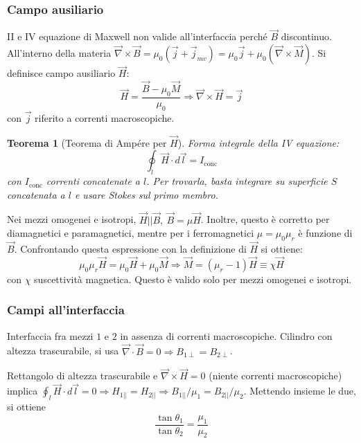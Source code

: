 \documentclass[10pt, a4paper]{scrartcl}
\numberwithin{equation}{subsection}
\theoremstyle{style1}
\newtheorem{teorema}{Teorema}[section]
\begin{document}
\subsubsection{Campo ausiliario}
II e IV equazione di Maxwell non valide all'interfaccia perch\'e $\vec{B}$ discontinuo. All'interno della materia $\vec{\nabla }\times \vec{B} = \mu_0 (\vec{j}+\vec{j}_{mv} )= \mu_0\vec{j} + \mu_0 (\vec{\nabla }\times \vec{M})$. Si definisce campo ausiliario $\vec{H}$:
\begin{equation}
		\vec{H} = \frac{\vec{B}- \mu_0\vec{M}}{\mu_0} \Rightarrow \vec{\nabla }\times \vec{H}= \vec{j}
\end{equation}
con $\vec{j}$ riferito a correnti macroscopiche.
\begin{teorema}
	[Teorema di Amp\'ere per $\vec{H}$]
	Forma integrale della IV equazione:
	\begin{equation}
		\oint_{l} \vec{H}\cdot d\vec{l}= I_\text{conc}
	\end{equation}
	con $I_\text{conc}$ correnti concatenate a $l$. Per trovarla, basta integrare su superficie $S$ concatenata a $l$ e usare Stokes sul primo membro.
\end{teorema}
Nei mezzi omogenei e isotropi, $\vec{H}| |\vec{B}, \ \vec{B} = \mu \vec{H}$. Inoltre, questo \`e corretto per diamagnetici e paramagnetici, mentre per i ferromagnetici $\mu = \mu_0 \mu _r$ \`e funzione di $\vec{B}$. Confrontando questa espressione con la definizione di $\vec{H}$ si ottiene:
\begin{equation}
	\mu_0 \mu_r \vec{H}=\mu_0 \vec{H}+ \mu_0\vec{M}\Rightarrow \vec{M}=(\mu_r -1) \vec{H}\equiv \chi \vec{H}
\end{equation}
con $\chi $ suscettivit\`a magnetica. Questo \`e valido solo per mezzi omogenei e isotropi.
\subsubsection{Campi all'interfaccia}

Interfaccia fra mezzi $1$ e $2$ in assenza di correnti macroscopiche. Cilindro con altezza trascurabile, si usa $\vec{\nabla }\cdot \vec{B} =0 \Rightarrow B_{1\perp} = B_{2\perp}  $.

Rettangolo di altezza trascurabile e $\vec{\nabla }\times \vec{H}=0$ (niente correnti macroscopiche) implica $\oint_{l} \vec{H}\cdot d\vec{l}= 0\Rightarrow H_{1||} = H_{2 | |}  \Rightarrow B_{1 | | }/ \mu_1 = B_{2  | |} / \mu_2  $. Mettendo insieme le due, si ottiene
\begin{equation}
	\frac{\tan \theta_1}{\tan \theta_2}= \frac{\mu_1}{\mu_2}
\end{equation}
\end{document}
